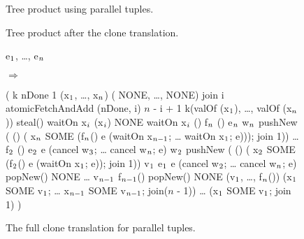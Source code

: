 \documentclass[nocopyrightspace,preprint]{../common/sigplanconf}
\begin{document}
\begin{figure}
  
  \caption{Tree product using parallel tuples.}
  \label{fig:tree-prod-ptup}
\end{figure}

\begin{figure}
  
  \caption{Tree product after the clone translation.}
  \label{fig:tree-prod-clone}
\end{figure}

\begin{figure}
\begin{center}
\begin{code}\cdmath{}
\LDB{} \kw{(|} e\(\sb{1}\), \ldots{}, e\(\sb{n}\) \kw{|)} \RDB{}
\end{code}%
$\Longrightarrow$ \\
\begin{code}\cdmath{}
( k \kw{=>}
    nDone \kw{=}  1
       (x\(\sb{1}\), \ldots{}, x\(\sb{n}\)) \kw{=} ( NONE, \ldots{},  NONE)
       join i \kw{=} 
           atomicFetchAndAdd (nDone, i) \kw{=} $n$ - i + 1 
            k(valOf (\kw{!}x\(\sb{1}\)), \ldots{}, valOf (\kw{!}x\(\sb{n}\)))
           steal()
       waitOn x\(\sb{i}\) \kw{=}  (\kw{!}x\(\sb{i}\)) \kw{=} NONE  waitOn x\(\sb{i}\)  ()
       f\(\sb{n}\) () \kw{=} \LDB{} e\(\sb{n}\) \RDB{}                        
       w\(\sb{n}\) \kw{=} pushNew ( () \kw{=>} (
                 x\(\sb{n}\) \kw{:=} SOME (f\(\sb{n}\)() 
                     e \kw{=>} (waitOn x\(\sb{n-1}\); \ldots{} waitOn x\(\sb{1}\); 
                                  e))); 
                 join 1))
           \ldots{} 
       f\(\sb{2}\) () \kw{=} \LDB{} e\(\sb{2}\) \RDB{}  e \kw{=>} (cancel w\(\sb{3}\); \ldots{} cancel w\(\sb{n}\);
                                      e)
       w\(\sb{2}\) \kw{=} pushNew ( () \kw{=>} (
                 x\(\sb{2}\) \kw{:=} SOME (f\(\sb{2}\)()  e \kw{=>} (waitOn x\(\sb{1}\); 
                                                e)); 
                 join 1)) 
       v\(\sb{1}\) \kw{=} \LDB{} e\(\sb{1}\) \RDB{} 
                e \kw{=>} (cancel w\(\sb{2}\); \ldots{} cancel w\(\sb{n}\);  e)
       popNew() \kw{<>} NONE 
          \ldots{}
            v\(\sb{n-1}\) \kw{=} f\(\sb{n-1}\)()
             popNew() \kw{<>} NONE 
                (v\(\sb{1}\), \ldots{}, f\(\sb{n}\)())
                (x\(\sb{1}\) \kw{:=} SOME v\(\sb{1}\); \ldots{} x\(\sb{n-1}\) \kw{:=} SOME v\(\sb{n-1}\); 
                 join($n$ - 1))
          \ldots{}
          (x\(\sb{1}\) \kw{:=} SOME v\(\sb{1}\); join 1)
  )
\end{code}
\end{center}
 \caption{The full clone translation for parallel tuples.}
 \label{fig:ptup-clone}
\end{figure}%
\end{document}
